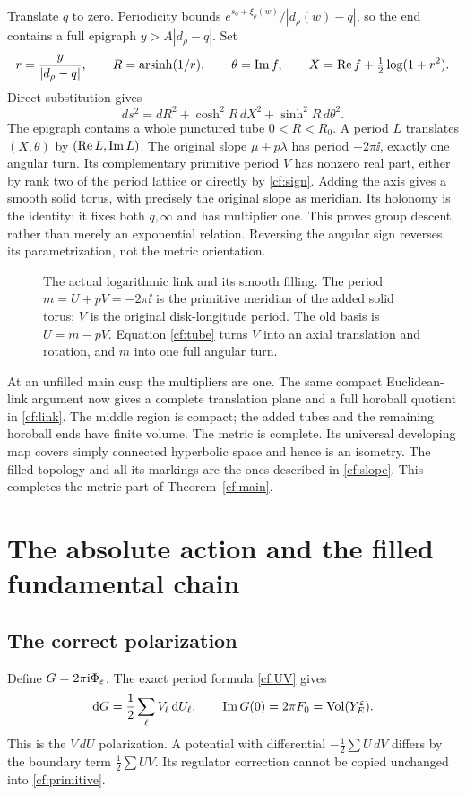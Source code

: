 Translate $q$ to zero. Periodicity bounds
$e^{s_0+\xi_\rho(w)}/|d_\rho(w)-q|$, so the end contains
a full epigraph $y>A|d_\rho-q|$.
Set
\[
 r=\frac{y}{|d_\rho-q|},\qquad
 R=\operatorname{arsinh}(1/r),\qquad
 \theta=\operatorname{Im} f,\qquad
 X=\operatorname{Re} f+\tfrac12\log(1+r^2).
 \]
Direct substitution gives
\begin{equation}\label{cf:tube}
 ds^2=dR^2+\cosh^2R\,dX^2+\sinh^2R\,d\theta^2 .
\end{equation}
The epigraph contains a whole punctured tube $0<R<R_0$.
A period $L$ translates $(X,\theta)$ by $(\operatorname{Re} L,\operatorname{Im} L)$.
The original slope $\mu+p\lambda$ has period $-2\pi\ii$,
exactly one angular turn. Its complementary primitive period
$V$ has nonzero real part, either by rank two of the period
lattice or directly by \eqref{cf:sign}.
Adding the axis gives a smooth solid torus, with precisely
the original slope as meridian. Its holonomy is the identity:
it fixes both $q,\infty$ and has multiplier one.
This proves group descent, rather than merely an exponential
relation. Reversing the angular sign reverses its parametrization,
not the metric orientation.

\begin{figure}[ht]
\centering
\caption{The actual logarithmic link and its smooth filling.
The period $m=U+pV=-2\pi\ii$ is the primitive meridian of the
added solid torus; $V$ is the original disk-longitude period.
The old basis is $U=m-pV$. Equation \eqref{cf:tube} turns
$V$ into an axial translation and rotation, and $m$ into
one full angular turn.}
\label{cf:filling-figure}
\end{figure}

At an unfilled main cusp the multipliers are one. The same
compact Euclidean-link argument now gives a complete translation
plane and a full horoball quotient in \eqref{cf:link}.
The middle region is compact; the added tubes and the remaining
horoball ends have finite volume. The metric is complete.
Its universal developing map covers simply connected hyperbolic
space and hence is an isometry. The filled topology and all
its markings are the ones described in \eqref{cf:slope}.
This completes the metric part of Theorem~\ref{cf:main}.

\section{The absolute action and the filled fundamental chain}
\label{cf:volume-proof}

\subsection{The correct polarization}
Define $G=2\pi\mathrm i\Phi_\varepsilon$. The exact period formula
\eqref{cf:UV} gives
\begin{equation}\label{cf:primitive}
 \mathrm d G=\frac12\sum_\ell V_\ell\,\mathrm d U_\ell,\qquad
 \operatorname{Im} G(0)=2\pi F_0=\operatorname{Vol}(Y^\varepsilon_E).
\end{equation}
This is the $V\,dU$ polarization. A potential with differential
$-\frac12\sum U\,dV$ differs by the boundary term
$\frac12\sum UV$. Its regulator correction cannot be copied
unchanged into \eqref{cf:primitive}.

